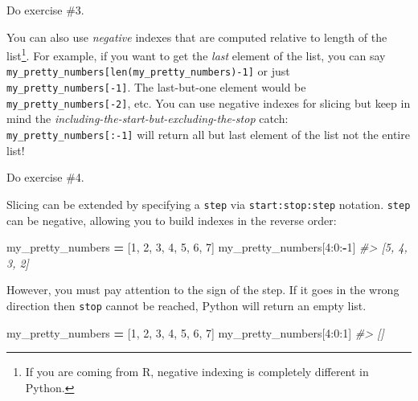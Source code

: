 \documentclass[
]{book}
\newenvironment{Shaded}{\begin{snugshade}}{\end{snugshade}}
\newcommand{\CommentTok}[1]{\textcolor[rgb]{0.56,0.35,0.01}{\textit{#1}}}
\newcommand{\DecValTok}[1]{\textcolor[rgb]{0.00,0.00,0.81}{#1}}
\newcommand{\NormalTok}[1]{#1}
\newcommand{\OperatorTok}[1]{\textcolor[rgb]{0.81,0.36,0.00}{\textbf{#1}}}
\begin{document}
Do exercise \#3.

You can also use \emph{negative} indexes that are computed relative to length of the list\footnote{If you are coming from R, negative indexing is completely different in Python.}. For example, if you want to get the \emph{last} element of the list, you can say \texttt{my\_pretty\_numbers{[}len(my\_pretty\_numbers)-1{]}} or just \texttt{my\_pretty\_numbers{[}-1{]}}. The last-but-one element would be \texttt{my\_pretty\_numbers{[}-2{]}}, etc. You can use negative indexes for slicing but keep in mind the \emph{including-the-start-but-excluding-the-stop} catch: \texttt{my\_pretty\_numbers{[}:-1{]}} will return all but last element of the list not the entire list!

Do exercise \#4.

Slicing can be extended by specifying a \texttt{step} via \texttt{start:stop:step} notation. \texttt{step} can be negative, allowing you to build indexes in the reverse order:

\begin{Shaded}
\begin{Highlighting}[]
\NormalTok{my\_pretty\_numbers }\OperatorTok{=}\NormalTok{ [}\DecValTok{1}\NormalTok{, }\DecValTok{2}\NormalTok{, }\DecValTok{3}\NormalTok{, }\DecValTok{4}\NormalTok{, }\DecValTok{5}\NormalTok{, }\DecValTok{6}\NormalTok{, }\DecValTok{7}\NormalTok{]}
\NormalTok{my\_pretty\_numbers[}\DecValTok{4}\NormalTok{:}\DecValTok{0}\NormalTok{:}\OperatorTok{{-}}\DecValTok{1}\NormalTok{]}
\CommentTok{\#\textgreater{} [5, 4, 3, 2]}
\end{Highlighting}
\end{Shaded}

However, you must pay attention to the sign of the step. If it goes in the wrong direction then \texttt{stop} cannot be reached, Python will return an empty list.

\begin{Shaded}
\begin{Highlighting}[]
\NormalTok{my\_pretty\_numbers }\OperatorTok{=}\NormalTok{ [}\DecValTok{1}\NormalTok{, }\DecValTok{2}\NormalTok{, }\DecValTok{3}\NormalTok{, }\DecValTok{4}\NormalTok{, }\DecValTok{5}\NormalTok{, }\DecValTok{6}\NormalTok{, }\DecValTok{7}\NormalTok{]}
\NormalTok{my\_pretty\_numbers[}\DecValTok{4}\NormalTok{:}\DecValTok{0}\NormalTok{:}\DecValTok{1}\NormalTok{]}
\CommentTok{\#\textgreater{} []}
\end{Highlighting}
\end{Shaded}
\end{document}
